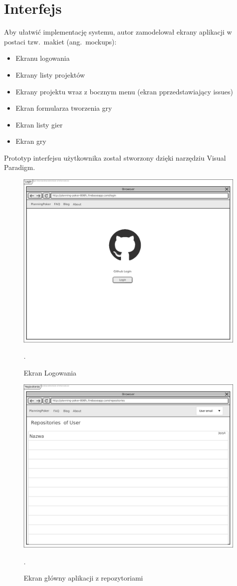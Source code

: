 \section{Interfejs}
Aby ułatwić implementację systemu, autor zamodelował ekrany aplikacji w postaci
tzw.\ makiet (ang.\ mockups):
\begin{itemize}
    \item Ekranu logowania
    \item Ekrany listy projektów
    \item Ekrany projektu wraz z bocznym menu (ekran pprzedstawiający issues)
    \item Ekran formularza tworzenia gry
    \item Ekran listy gier
    \item Ekran gry
\end{itemize}
Prototyp interfejsu użytkownika został stworzony dzięki narzędziu Visual Paradigm.
\begin{figure}[H]
	\centering\includegraphics[width=.7\textwidth]{img/LoginScreen}
	\caption{Ekran Logowania}.\label{rys:loginScreen}
\end{figure}
\begin{figure}[H]
	\centering\includegraphics[width=.7\textwidth]{img/RepositoriesScreen}
	\caption{Ekran główny aplikacji z repozytoriami}.\label{rys:RepositoriesScreen}
\end{figure}
